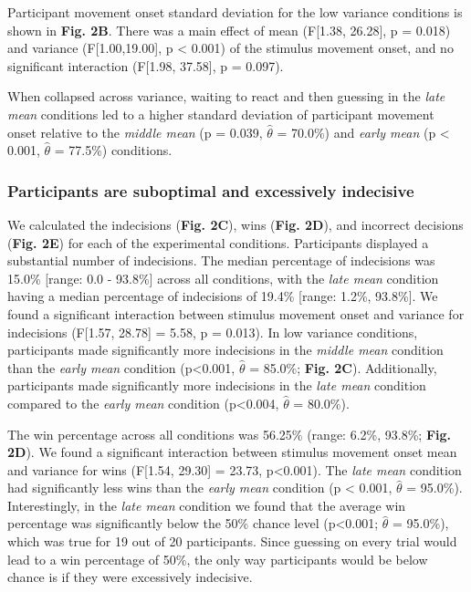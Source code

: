 \documentclass[man,donotrepeattitle,floatsintext,letterpaper,12pt]{apa7}
\newcommand\boldblue[1]{\textcolor{mydarkblue}{\textbf{#1}}}
\begin{document}
Participant movement onset standard deviation for the low variance conditions is shown in \boldblue{Fig. 2B}. There was a main effect of mean (F[1.38, 26.28], p = 0.018) and variance (F[1.00,19.00], p < 0.001) of the stimulus movement onset, and no significant interaction (F[1.98, 37.58], p = 0.097). 


\noindent When collapsed across variance, waiting to react and then guessing in the \emph{late mean} conditions led to a higher standard deviation of participant movement onset relative to the \emph{middle mean} (p = 0.039, $\hat{\theta}$ = 70.0\%) and \emph{early mean} (p < 0.001, $\hat{\theta}$ = 77.5\%) conditions.

\subsubsection{Participants are suboptimal and excessively indecisive}

\noindent We calculated the indecisions (\boldblue{Fig. 2C}), wins (\boldblue{Fig. 2D}), and incorrect decisions (\boldblue{Fig. 2E}) for each of the experimental conditions. Participants displayed a substantial number of indecisions. The median percentage of indecisions was 15.0\% [range: 0.0 - 93.8\%] across all conditions, with the \emph{late mean} condition having a median percentage of indecisions of 19.4\% [range: 1.2\%, 93.8\%]. We found a significant interaction between stimulus movement onset and variance for indecisions (F[1.57, 28.78] = 5.58, p = 0.013). In low variance conditions, participants made significantly more indecisions in the \emph{middle mean} condition than the \emph{early mean} condition (p<0.001, $\hat{\theta}$ = 85.0\%; \boldblue{Fig. 2C}). Additionally, participants made significantly more indecisions in the \emph{late mean} condition compared to the \emph{early mean} condition (p<0.004, $\hat{\theta}$ = 80.0\%).

The win percentage across all conditions was 56.25\% (range: 6.2\%, 93.8\%; \boldblue{Fig. 2D}). We found a significant interaction between stimulus movement onset mean and variance for wins (F[1.54, 29.30] = 23.73, p<0.001). The \emph{late mean} condition had significantly less wins than the \emph{early mean} condition (p < 0.001, $\hat{\theta}$ = 95.0\%). Interestingly, in the \emph{late mean} condition we found that the average win percentage was significantly below the 50\% chance level (p<0.001; $\hat{\theta}$ = 95.0\%), which was true for 19 out of 20 participants. Since guessing on every trial would lead to a win percentage of 50\%, the only way participants would be below chance is if they were excessively indecisive.
\end{document}

